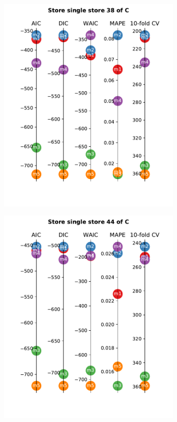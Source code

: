 \documentclass[english, 12pt, a4paper, sci, utf8, a-1b, online]{aaltothesis}
\begin{document}
\begin{figure}
\begin{subfigure}[htb]{0.33\textwidth}
		\includegraphics[width=\textwidth]{../plots/metrics/metrics_plot_single_store_38_of_C.pdf}
	\end{subfigure}
	\hfill
	\begin{subfigure}[htb]{0.33\textwidth}
		\centering
		\includegraphics[width=\textwidth]{../plots/metrics/metrics_plot_single_store_44_of_C.pdf}

\end{subfigure}
\end{figure}
\end{document}

